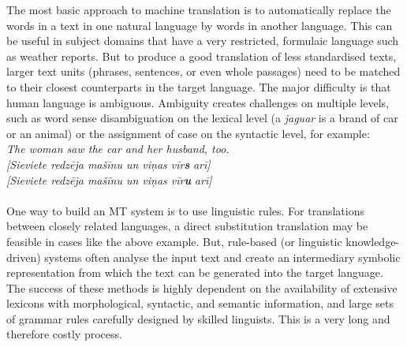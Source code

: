 \begin{multicols}{2}
The most basic approach to machine translation is to automatically replace the words in a text in one natural language by words in another language.
This can be useful in subject domains that have a very restricted, formulaic language such as weather reports.
But to produce a good translation of less standardised texts, larger text units (phrases, sentences, or even whole passages) need to be matched to their closest counterparts in the target language.
The major difficulty is that human language is ambiguous.
Ambiguity creates challenges on multiple levels, such as word sense disambiguation on the lexical level (a \textit{jaguar} is a brand of car or an animal) or the assignment of case on the syntactic level, for example:
\\
\textit{The woman saw the car and her husband, too.}\\
\textit{[Sieviete redzēja mašīnu un viņas vīr}\textbf{\textit{s}}\textit{ arī]}\\
\textit{[Sieviete redzēja mašīnu un viņas vīr}\textbf{\textit{u}}\textit{ arī]}\\
\\
One way to build an MT system is to use linguistic rules.
For translations between closely related languages, a direct substitution translation may be feasible in cases like the above example.
But, rule-based (or linguistic knowledge-driven) systems often analyse the input text and create an intermediary symbolic representation from which the text can be generated into the target language.
The success of these methods is highly dependent on the availability of extensive lexicons with morphological, syntactic, and semantic information, and large sets of grammar rules carefully designed by skilled linguists.
This is a very long and therefore costly process.


\end{multicols}
